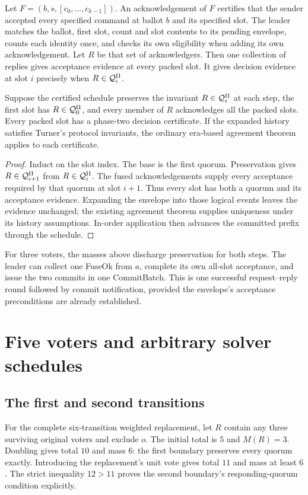 Let $F=(b,s,[c_0,\ldots,c_{k-1}])$. An acknowledgement of $F$ certifies that
the sender accepted every specified command at ballot $b$ and its specified
slot. The leader matches the ballot, first slot, count and slot contents to its
pending envelope, counts each identity once, and checks its own eligibility
when adding its own acknowledgement. Let $R$ be that set of acknowledgers.
Then one collection of replies gives acceptance evidence at every packed slot.
It gives decision evidence at slot $i$ precisely when $R\in\mathcal{Q}^{\mathrm {II}}_i$.

\begin{theorem}\label{thm:fuse}
Suppose the certified schedule preserves the invariant $R\in\mathcal{Q}^{\mathrm {II}}_i$ at each
step, the first slot has $R\in\mathcal{Q}^{\mathrm {II}}_0$, and every member of $R$ acknowledges
all the packed slots. Every packed slot has a phase-two decision certificate.
If the expanded history satisfies Turner's protocol invariants, the ordinary
era-based agreement theorem applies to each certificate.
\end{theorem}
\begin{proof}
Induct on the slot index. The base is the first quorum. Preservation gives
$R\in\mathcal{Q}^{\mathrm {II}}_{i+1}$ from $R\in\mathcal{Q}^{\mathrm {II}}_i$. The fused acknowledgements supply every
acceptance required by that quorum at slot $i+1$. Thus every slot has both a
quorum and its acceptance evidence. Expanding the envelope into those logical
events leaves the evidence unchanged; the existing agreement theorem supplies
uniqueness under its history assumptions. In-order application then advances
the committed prefix through the schedule.
\end{proof}
For three voters, the masses above discharge preservation for both steps.
The leader can collect one FuseOk from $a$, complete its own all-slot
acceptance, and issue the two commits in one CommitBatch. This is one successful
request--reply round followed by commit notification, provided the envelope's
acceptance preconditions are already established.

\section{Five voters and arbitrary solver schedules}\label{sec:fuse-five}
\subsection{The first and second transitions}
For the complete six-transition weighted replacement, let $R$ contain any
three surviving original voters and exclude $o$. The initial total is $5$ and
$M(R)=3$. Doubling gives total $10$ and mass $6$: the first boundary preserves
every quorum exactly. Introducing the replacement's unit vote gives total $11$
and mass at least $6$. The strict inequality $12>11$ proves the second
boundary's responding-quorum condition explicitly.

